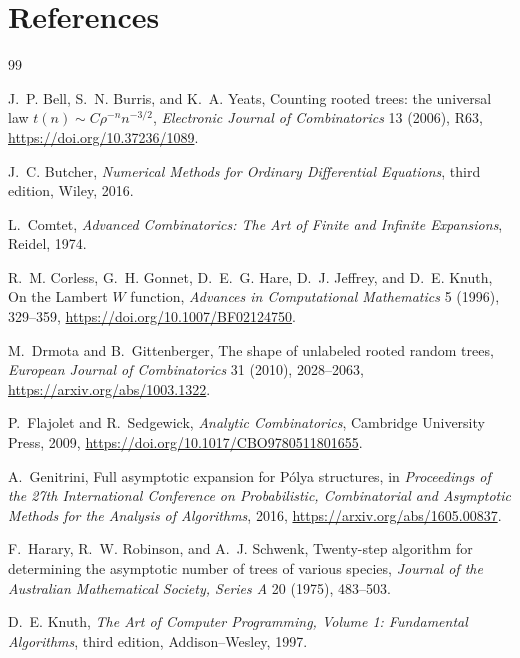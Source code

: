 \documentclass[11pt]{article}
\theoremstyle{definition}
\theoremstyle{remark}
\begin{document}
\section{References}

\begin{thebibliography}{99}

J.~P. Bell, S.~N. Burris, and K.~A. Yeats,
\newblock Counting rooted trees: the universal law
$t(n)\sim C\rho^{-n}n^{-3/2}$,
\newblock \emph{Electronic Journal of Combinatorics} 13 (2006), R63,
\newblock \url{https://doi.org/10.37236/1089}.

J.~C. Butcher,
\newblock \emph{Numerical Methods for Ordinary Differential Equations},
third edition,
\newblock Wiley, 2016.

L.~Comtet,
\newblock \emph{Advanced Combinatorics: The Art of Finite and Infinite
Expansions},
\newblock Reidel, 1974.

R.~M. Corless, G.~H. Gonnet, D.~E.~G. Hare, D.~J. Jeffrey, and D.~E. Knuth,
\newblock On the Lambert $W$ function,
\newblock \emph{Advances in Computational Mathematics} 5 (1996), 329--359,
\newblock \url{https://doi.org/10.1007/BF02124750}.

M.~Drmota and B.~Gittenberger,
\newblock The shape of unlabeled rooted random trees,
\newblock \emph{European Journal of Combinatorics} 31 (2010), 2028--2063,
\newblock \url{https://arxiv.org/abs/1003.1322}.

P.~Flajolet and R.~Sedgewick,
\newblock \emph{Analytic Combinatorics},
\newblock Cambridge University Press, 2009,
\newblock \url{https://doi.org/10.1017/CBO9780511801655}.

A.~Genitrini,
\newblock Full asymptotic expansion for P\'olya structures,
\newblock in \emph{Proceedings of the 27th International Conference on
Probabilistic, Combinatorial and Asymptotic Methods for the Analysis of
Algorithms}, 2016,
\newblock \url{https://arxiv.org/abs/1605.00837}.

F.~Harary, R.~W. Robinson, and A.~J. Schwenk,
\newblock Twenty-step algorithm for determining the asymptotic number of
trees of various species,
\newblock \emph{Journal of the Australian Mathematical Society, Series A}
20 (1975), 483--503.

D.~E. Knuth,
\newblock \emph{The Art of Computer Programming, Volume 1: Fundamental
Algorithms}, third edition,
\newblock Addison--Wesley, 1997.


\end{thebibliography}
\end{document}
